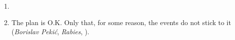 \documentclass[10pt]{report}%
\begin{document}
\begin{enumerate}
\medskip

\item 

\medskip

\item The plan is O.K. Only that, for some reason, the events do not stick to it (\emph{Borislav Peki\'{c}}, \emph{Rabies}, ).

\end{enumerate}

\end{document}
